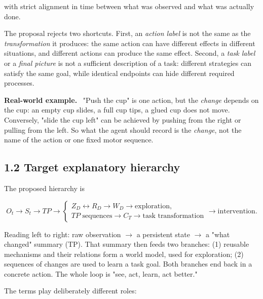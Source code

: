\documentclass[11pt]{article}
\newenvironment{plainword}{%
  \par\medskip\noindent\begin{minipage}{\textwidth}%
  \color{gray!75!black}\small\itshape
}{%
  \end{minipage}\par\medskip}
\newenvironment{example}{%
  \par\smallskip\noindent\begin{minipage}{\textwidth}%
  \color{teal!60!black}\small
  \textbf{\color{teal!70!black}Real-world example.}\
}{%
  \end{minipage}\par\smallskip}
\begin{document}
with strict alignment in time between what was observed and what was actually done.

The proposal rejects two shortcuts. First, an \emph{action label} is not the same as the \emph{transformation} it produces: the
same action can have different effects in different situations, and different actions can produce the same effect. Second, a
\emph{task label} or a \emph{final picture} is not a sufficient description of a task: different strategies can satisfy the same
goal, while identical endpoints can hide different required processes.

\begin{example}
"Push the cup" is one action, but the \emph{change} depends on the cup: an empty cup slides, a full cup tips, a glued cup does
not move. Conversely, "slide the cup left" can be achieved by pushing from the right or pulling from the left. So what the agent
should record is the \emph{change}, not the name of the action or one fixed motor sequence.
\end{example}

\subsection*{1.2 Target explanatory hierarchy}

The proposed hierarchy is

\[
\boxed{
O_t\rightarrow S_t\rightarrow TP\rightarrow
\left\{
\begin{array}{l}
Z_D\leftrightarrow R_D\rightarrow W_D\rightarrow \text{exploration},\\
TP\text{ sequences}\rightarrow C_T\rightarrow \text{task transformation}
\end{array}
\right.
\rightarrow \text{intervention}.}
\]

\begin{plainword}
Reading left to right: raw observation $\to$ a persistent state $\to$ a "what changed" summary (TP). That summary then feeds two
branches: (1) reusable mechanisms and their relations form a world model, used for exploration; (2) sequences of changes are used
to learn a task goal. Both branches end back in a concrete action. The whole loop is "see, act, learn, act better."
\end{plainword}

The terms play deliberately different roles:
\end{document}
